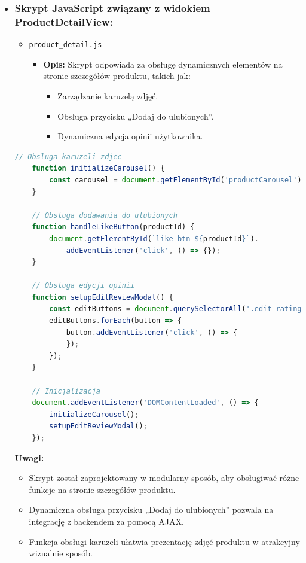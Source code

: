 \documentclass[12pt,a4paper,oneside]{article}
\theoremstyle{definition}
\numberwithin{equation}{section}
\begin{document}
\begin{itemize}
    \item \subsubsection{Skrypt JavaScript związany z widokiem ProductDetailView:}
        \begin{itemize}
            \item \texttt{product\_detail.js}
            \begin{itemize}
                \item \textbf{Opis:} Skrypt odpowiada za obsługę dynamicznych elementów na stronie szczegółów produktu, takich jak:
                \begin{itemize}
                    \item Zarządzanie karuzelą zdjęć.
                    \item Obsługa przycisku „Dodaj do ulubionych”.
                    \item Dynamiczna edycja opinii użytkownika.
                \end{itemize}
            \end{itemize}
        \end{itemize}

        \begin{lstlisting}[language=JavaScript, caption=Skrypt product\_detail.js]
    // Obsluga karuzeli zdjec
    function initializeCarousel() {
        const carousel = document.getElementById('productCarousel');
    }

    // Obsluga dodawania do ulubionych
    function handleLikeButton(productId) {
        document.getElementById(`like-btn-${productId}`).
            addEventListener('click', () => {});
    }

    // Obsluga edycji opinii
    function setupEditReviewModal() {
        const editButtons = document.querySelectorAll('.edit-rating-btn');
        editButtons.forEach(button => {
            button.addEventListener('click', () => {
            });
        });
    }

    // Inicjalizacja
    document.addEventListener('DOMContentLoaded', () => {
        initializeCarousel();
        setupEditReviewModal();
    });
        \end{lstlisting}

        \textbf{Uwagi:}
            \begin{itemize}
                \item Skrypt został zaprojektowany w modularny sposób, aby obsługiwać różne funkcje na stronie szczegółów produktu.
                \item Dynamiczna obsługa przycisku „Dodaj do ulubionych” pozwala na integrację z backendem za pomocą AJAX.
                \item Funkcja obsługi karuzeli ułatwia prezentację zdjęć produktu w atrakcyjny wizualnie sposób.
            \end{itemize}
\end{itemize}
\end{document}
